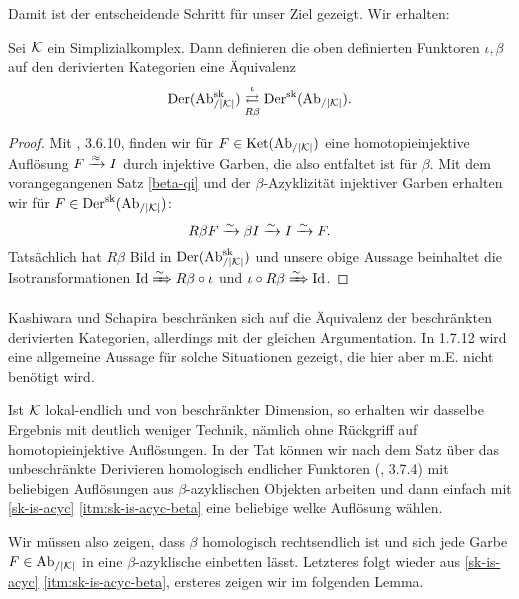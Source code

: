 Damit ist der entscheidende Schritt für unser Ziel gezeigt. Wir
erhalten:
\begin{theorem} \label{dersk-eq}
  Sei $\mathcal{K}$ ein Simplizialkomplex. Dann definieren die oben definierten
  Funktoren $\iota, \beta$ auf den derivierten Kategorien eine
  Äquivalenz
  \[ \operatorname{Der}(\operatorname{Ab}_{/|\mathcal{K}|}^{\operatorname{sk}})
  \mathrel{\mathop{\rightleftarrows}^{\iota}_{R \beta}}
  \operatorname{Der}^{\operatorname{sk}}(\operatorname{Ab}_{/|\mathcal{K}|}). \]
\end{theorem}
\begin{proof}

  Mit \cite{TD}, 3.6.10, finden wir für $F \in \operatorname{Ket}(\operatorname{Ab}_{/|\mathcal{K}|})$ eine
  homotopieinjektive Auflösung $F \xrightarrow{\approx} I$ durch injektive Garben, die
  also entfaltet ist für $\beta$. Mit dem vorangegangenen Satz
  \ref{beta-qi} und der $\beta$-Azyklizität injektiver Garben erhalten
  wir für $F \in \operatorname{Der}^{\operatorname{sk}}(\operatorname{Ab}_{/|\mathcal{K}|})$:
  \[R \beta F \xrightarrow[]{\sim} \beta I \xrightarrow[]{\sim} I \xrightarrow[]{\sim} F. \]
  Tatsächlich hat $R \beta$ Bild in $\operatorname{Der}(\operatorname{Ab}_{/|\mathcal{K}|}^{\operatorname{sk}})$ und unsere obige
  Aussage beinhaltet die Isotransformationen $\operatorname{Id} \xRightarrow{\sim} R \beta
  \circ \iota$ und $\iota \circ R \beta \xRightarrow{\sim} \operatorname{Id}$.
\end{proof}
\begin{bem}
  Kashiwara und Schapira beschränken sich auf die Äquivalenz der
  beschränkten derivierten Kategorien, allerdings mit der gleichen
  Argumentation. In \cite{KS} 1.7.12 wird eine allgemeine Aussage für
  solche Situationen gezeigt, die hier aber m.E. nicht benötigt wird.
\end{bem}
\begin{bem}
  Ist $\mathcal{K}$ lokal-endlich und von beschränkter Dimension, so erhalten
  wir dasselbe Ergebnis mit deutlich weniger Technik, nämlich ohne
  Rückgriff auf homotopieinjektive Auflösungen. In der Tat können wir
  nach dem Satz über das unbeschränkte Derivieren homologisch
  endlicher Funktoren (\cite{TG}, 3.7.4) mit beliebigen Auflösungen
  aus $\beta$-azyklischen Objekten arbeiten und dann einfach mit
  \ref{sk-is-acyc} \ref{itm:sk-is-acyc-beta} eine beliebige welke
  Auflösung wählen.

  Wir müssen also zeigen, dass $\beta$ homologisch rechtsendlich ist
  und sich jede Garbe $F \in \operatorname{Ab}_{/|\mathcal{K}|}$ in eine $\beta$-azyklische
  einbetten lässt. Letzteres folgt wieder aus \ref{sk-is-acyc}
  \ref{itm:sk-is-acyc-beta}, ersteres zeigen wir im folgenden Lemma.


\end{bem}
